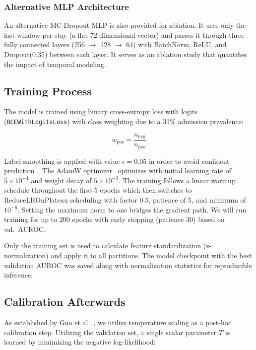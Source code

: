 \documentclass[conference]{IEEEtran}
\begin{document}
\subsubsection{Alternative MLP Architecture}
An alternative MC-Dropout MLP is also provided for ablation. It uses only the last window per stay (a flat 72-dimensional vector) and passes it through three fully connected layers (256 $\rightarrow$ 128 $\rightarrow$ 64) with BatchNorm, ReLU, and Dropout(0.35) between each layer. It serves as an ablation study that quantifies the impact of temporal modeling.

\subsection{Training Process}

The model is trained using binary cross-entropy loss with logits (\texttt{BCEWithLogitsLoss}) with class weighting due to a 31\% admission prevalence:

\begin{equation}
w_{\text{pos}} = \frac{n_{\text{neg}}}{n_{\text{pos}}}
\end{equation}

Label smoothing is applied with value $\epsilon = 0.05$ in order to avoid confident prediction~\cite{Muller2019}. The AdamW optimizer~\cite{Loshchilov2019} optimizes with initial learning rate of $5 \times 10^{-4}$ and weight decay of $5 \times 10^{-3}$. The training follows a linear warmup schedule throughout the first 5 epochs which then switches to ReduceLROnPlateau scheduling with factor 0.5, patience of 5, and minimum of $10^{-6}$. Setting the maximum norm to one bridges the gradient path. We will run training for up to 200 epochs with early stopping (patience 30) based on val.\ AUROC.

Only the training set is used to calculate feature standardization (z-normalization) and apply it to all partitions. The model checkpoint with the best validation AUROC was saved along with normalization statistics for reproducible inference.

\subsection{Calibration Afterwards}

As established by Guo et al.~\cite{Guo2017}, we utilize temperature scaling as a post-hoc calibration step. Utilizing the validation set, a single scalar parameter $T$ is learned by minimizing the negative log-likelihood:
\end{document}
